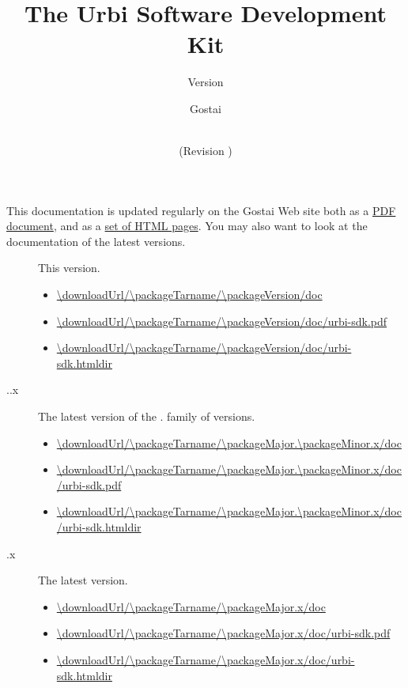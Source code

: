 \documentclass[openright,twoside,11pt,final]{book}
\title{The Urbi Software Development Kit}
\subtitle{Version \packageVersion}
\date{\VcsDay\\(Revision \VcsDescription)}
\author{Gostai}
\begin{document}
\maketitle

This documentation is updated regularly on the Gostai Web site both as a
\href{\docurl/urbi-sdk.pdf}{PDF document}, and as a
\href{\docurl/urbi-sdk.htmldir}{set of HTML pages}.  You may also want to
look at the documentation of the latest versions.

\newcommand{\versionItem}[2]
{
\item[\packageName{} #1] #2.

  \begin{itemize}
  \item \url{\downloadUrl/\packageTarname/#1/doc}
  \item \url{\downloadUrl/\packageTarname/#1/doc/urbi-sdk.pdf}
  \item \url{\downloadUrl/\packageTarname/#1/doc/urbi-sdk.htmldir}
  \end{itemize}
}
\begin{description}
\versionItem{\packageVersion}{This version}
\versionItem{\packageMajor.\packageMinor.x}{The latest version of the
  \packageMajor.\packageMinor{} family of versions}
\versionItem{\packageMajor.x}{The latest version}
\end{description}



\tableofcontents







{
  
}

\end{document}
